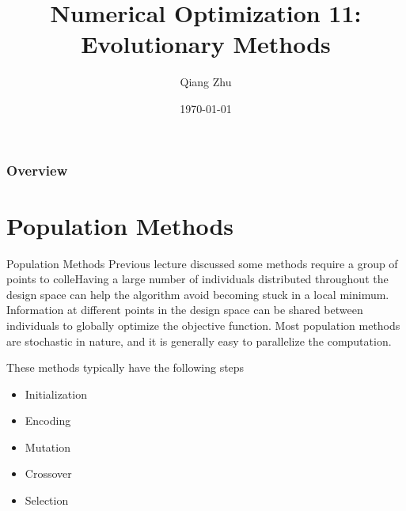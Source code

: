 \documentclass{beamer}
\title[Evolutionary Methods]{Numerical Optimization 11: Evolutionary Methods} %
\author{Qiang Zhu} %
\institute[University of Nevada Las Vegas] %
{
University of Nevada Las Vegas\\ %
\medskip
}
\date{\today} %
\begin{document}
\begin{frame}
\titlepage %
\end{frame}

\begin{frame}
\frametitle{Overview} %
\tableofcontents %
\end{frame}



\section{Population Methods}
\begin{frame}{Population Methods}
Previous lecture discussed some methods require a group of points to colleHaving a large number of individuals distributed throughout the design space can help the algorithm avoid becoming stuck in a local minimum. Information at different points in the design space can be shared between individuals to globally optimize the objective function. Most population methods are stochastic in nature, and it is generally easy to parallelize the computation. 

These methods typically have the following steps
\begin{itemize}
    \item Initialization
    \item Encoding
    \item Mutation
    \item Crossover
    \item Selection
\end{itemize}

\end{frame}
\end{document}
